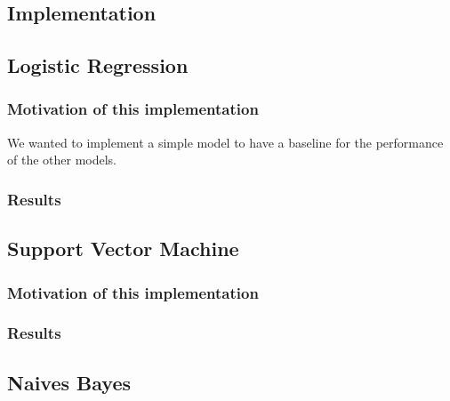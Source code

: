 \documentclass{article}
\begin{document}

    \subsection{Implementation}\label{subsec:implementation}

    \subsection{Logistic Regression}\label{subsec:logistic-regression}

    \subsubsection{Motivation of this implementation}
    We wanted to implement a simple model to have a baseline for the performance of the other models.

    \subsubsection{Results}

    \subsection{Support Vector Machine}\label{subsec:support-vector-machine}

    \subsubsection{Motivation of this implementation}

    \subsubsection{Results}

    \subsection{Naives Bayes}\label{subsec:naives-bayes}
\end{document}
